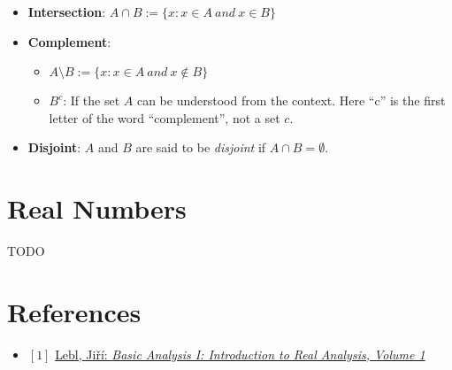 \documentclass[12pt, letterpaper, oneside]{book}
\begin{document}
\begin{itemize}
  \item \textbf{Intersection}: $A \cap B := \{x: x \in A \ and \ x \in B\}$
  \item \textbf{Complement}:
    \begin{itemize}
      \item $A \setminus B := \{x: x \in A \ and \ x \notin B\}$
      \item $B^c$: If the set $A$ can be understood from the context. Here ``c''
        is the first letter of the word ``complement'', not a set $c$.
    \end{itemize}
  \item \textbf{Disjoint}: $A$ and $B$ are said to be \textit{disjoint} if $A
    \cap B = \emptyset$.
\end{itemize}

%
%

\chapter{Real Numbers}

TODO

\chapter*{References}

\begin{itemize}
  \item $[1]$ \href{https://ocw.mit.edu/courses/18-100a-real-analysis-fall-2020/resources/mit18_100af20_basic_analysis/}{Lebl, Jiří: \it{Basic Analysis I: Introduction to Real Analysis, Volume 1}}
\end{itemize}
\end{document}
